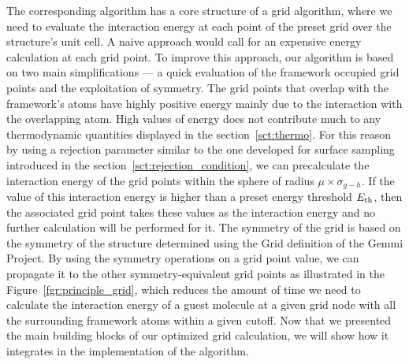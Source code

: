 \documentclass[main]{subfiles}
\begin{document}
The corresponding algorithm has a core structure of a grid algorithm, where we need to evaluate the interaction energy at each point of the preset grid over the structure's unit cell. A naive approach would call for an expensive energy calculation at each grid point. To improve this approach, our algorithm is based on two main simplifications --- a quick evaluation of the framework occupied grid points and the exploitation of symmetry. The grid points that overlap with the framework's atoms have highly positive energy mainly due to the interaction with the overlapping atom. High values of energy does not contribute much to any thermodynamic quantities displayed in the section~\ref{sct:thermo}. For this reason by using a rejection parameter similar to the one developed for surface sampling introduced in the section~\ref{sct:rejection_condition}, we can precalculate the interaction energy of the grid points within the sphere of radius $\mu\times\sigma_{g-h}$. If the value of this interaction energy is higher than a preset energy threshold $E_{\text{th}}$, then the associated grid point takes these values as the interaction energy and no further calculation will be performed for it. The symmetry of the grid is based on the symmetry of the structure determined using the Grid definition of the Gemmi Project. By using the symmetry operations on a grid point value, we can propagate it to the other symmetry-equivalent grid points as illustrated in the Figure~\ref{fgr:principle_grid}, which reduces the amount of time we need to calculate the interaction energy of a guest molecule at a given grid node with all the surrounding framework atoms within a given cutoff. Now that we presented the main building blocks of our optimized grid calculation, we will show how it integrates in the implementation of the algorithm.
\end{document}
